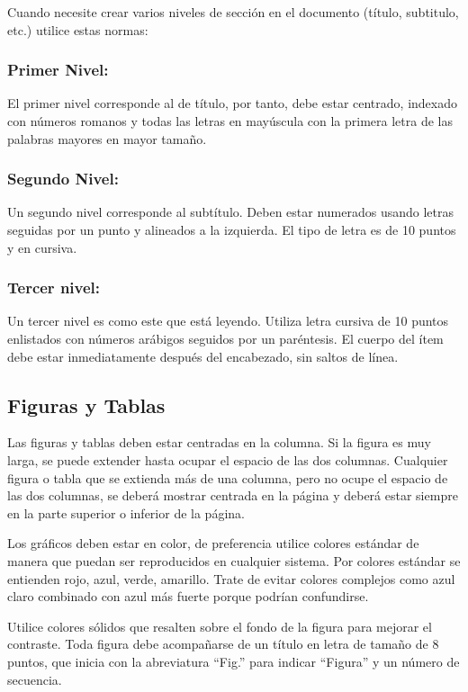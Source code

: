 \documentclass[10pt,twocolumn,letterpaper]{article}
\begin{document}
Cuando necesite crear varios niveles de sección en el documento (título, subtitulo, etc.) utilice estas normas:

\subsubsection{Primer Nivel:\;}
El primer nivel corresponde al de título, por tanto, debe estar centrado, indexado con números romanos y todas las letras en mayúscula con la primera letra de las palabras mayores en mayor tamaño.

\subsubsection{Segundo Nivel:\;}
Un segundo nivel corresponde al subtítulo. Deben estar numerados usando letras seguidas por un punto y alineados a la izquierda. El tipo de letra es de 10 puntos y en cursiva.

\subsubsection{Tercer nivel:\;}
Un tercer nivel es como este que está leyendo. Utiliza letra cursiva de 10 puntos enlistados con números arábigos seguidos por un paréntesis. El cuerpo del ítem debe estar inmediatamente después del encabezado, sin saltos de línea.

\subsection{Figuras y Tablas}
Las figuras y tablas deben estar centradas en la columna. Si la figura es muy larga, se puede extender hasta ocupar el espacio de las dos columnas. Cualquier figura o tabla que se extienda más de una columna, pero no ocupe el espacio de las dos columnas, se deberá mostrar centrada en la página y deberá estar siempre en la parte superior o inferior de la página.

Los gráficos deben estar en color, de preferencia utilice colores estándar de manera que puedan ser reproducidos en cualquier sistema. Por colores estándar se entienden rojo, azul, verde, amarillo. Trate de evitar colores complejos como azul claro combinado con azul más fuerte porque podrían confundirse.

Utilice colores sólidos que resalten sobre el fondo de la figura para mejorar el contraste.
Toda figura debe acompañarse de un título en letra de tamaño de 8 puntos, que inicia con la abreviatura “Fig.” para indicar “Figura” y un número de secuencia.
\end{document}
